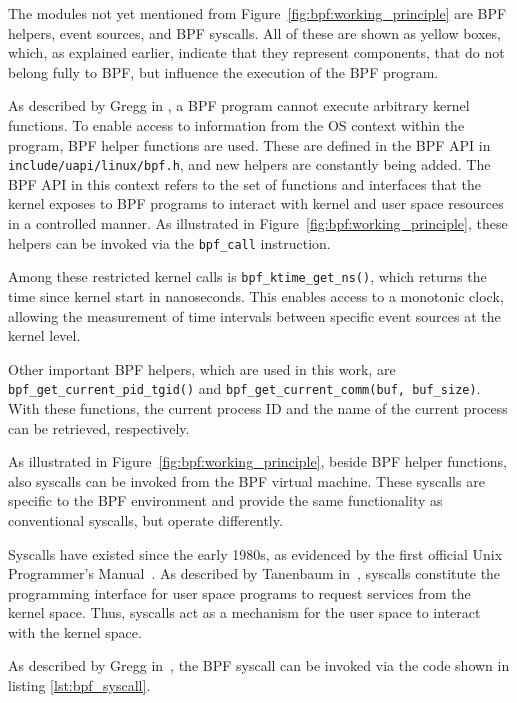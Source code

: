 The modules not yet mentioned from Figure~\ref{fig:bpf:working_principle} are BPF helpers, event sources, and BPF syscalls.  
All of these are shown as yellow boxes, which, as explained earlier, indicate that they represent components, that do not belong fully to \ac{BPF}, but influence the execution of the \ac{BPF} program.  

As described by Gregg in \cite[Chap.~2.3.6]{Gregg_2020}, a \ac{BPF} program cannot execute arbitrary kernel functions.  
To enable access to information from the \ac{OS} context within the program, BPF helper functions are used.  
These are defined in the BPF API in \texttt{include/uapi/linux/bpf.h}, and new helpers are constantly being added.  
The BPF API in this context refers to the set of functions and interfaces that the kernel exposes to \ac{BPF} programs to interact with kernel and user space resources in a controlled manner.  
As illustrated in Figure~\ref{fig:bpf:working_principle}, these helpers can be invoked via the \texttt{bpf\_call} instruction.  
 
Among these restricted kernel calls is \texttt{bpf\_ktime\_get\_ns()}, which returns the time since kernel start in nanoseconds.  
This enables access to a monotonic clock, allowing the measurement of time intervals between specific event sources at the kernel level.  

Other important BPF helpers, which are used in this work, are \\
\texttt{bpf\_get\_current\_pid\_tgid()} and \texttt{bpf\_get\_current\_comm(buf, buf\_size)}.  
With these functions, the current process ID and the name of the current process can be retrieved, respectively. 

As illustrated in Figure~\ref{fig:bpf:working_principle}, beside \ac{BPF} helper functions, also syscalls can be invoked from the \ac{BPF} virtual machine.  
These syscalls are specific to the \ac{BPF} environment and provide the same functionality as conventional syscalls, but operate differently.  

Syscalls have existed since the early 1980s, as evidenced by the first official Unix Programmer's Manual~\cite{bell}.  
As described by Tanenbaum in~\cite[p.~50--53]{Tanenbaum_2014}, syscalls constitute the programming interface for user space programs to request services from the kernel space.  
Thus, syscalls act as a mechanism for the user space to interact with the kernel space.  

As described by Gregg in~\cite[Chap.~2.3.6]{Gregg_2020}, the \ac{BPF} syscall can be invoked via the code shown in listing \ref{lst:bpf_syscall}.

